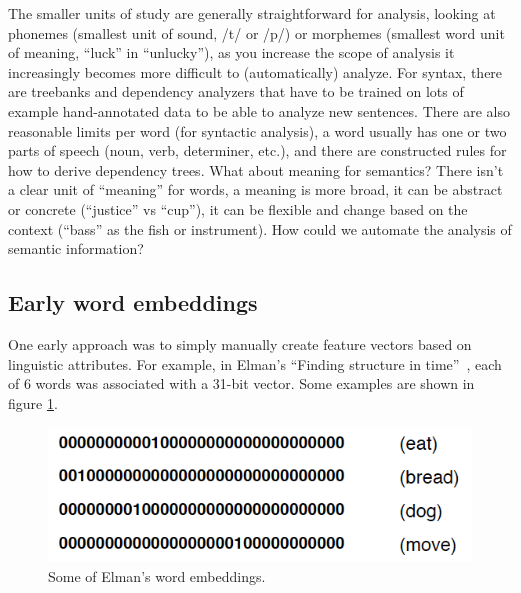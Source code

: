 The smaller units of study are generally straightforward for analysis, looking at phonemes (smallest unit of sound, /t/ or /p/) or morphemes (smallest word unit of meaning, ``luck'' in ``unlucky''), as you increase the scope of analysis it increasingly becomes more difficult to (automatically) analyze. For syntax, there are treebanks and dependency analyzers that have to be trained on lots of example hand-annotated data to be able to analyze new sentences. There are also reasonable limits per word (for syntactic analysis), a word usually has one or two parts of speech (noun, verb, determiner, etc.), and there are constructed rules for how to derive dependency trees. What about meaning for semantics? There isn't a clear unit of ``meaning'' for words, a meaning is more broad, it can be abstract or concrete (``justice'' vs ``cup''), it can be flexible and change based on the context (``bass'' as the fish or instrument). How could we automate the analysis of semantic information?



\subsection{Early word embeddings}

One early approach was to simply manually create feature vectors based on linguistic attributes.  For example, in Elman's ``Finding structure in time''~\cite{elman1990finding}, each of 6 words was associated with a 31-bit vector.  Some examples are shown in figure \ref{elmanWordEmbeddings}.

\begin{figure}[h]
\centering
\includegraphics[scale=.5]{./images/elmanWordEmbeddings.png}
\caption[From \cite{elman1990finding}.]{Some of Elman's word embeddings. }
\label{elmanWordEmbeddings}
\end{figure}

